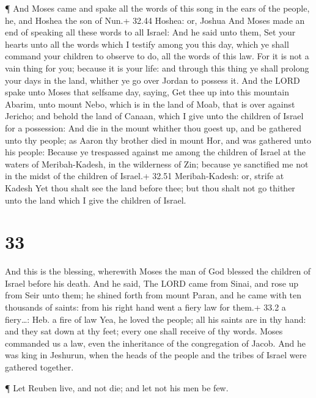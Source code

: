  ¶ And Moses came and spake all the words of this song in
the ears of the people, he, and Hoshea the son of Nun.+ 32.44 Hoshea:
or, Joshua  And Moses made an end of speaking all these
words to all Israel:  And he said unto them, Set your
hearts unto all the words which I testify among you this day, which ye
shall command your children to observe to do, all the words of this law.
 For it is not a vain thing for you; because it is your
life: and through this thing ye shall prolong your days in the land,
whither ye go over Jordan to possess it.  And the LORD
spake unto Moses that selfsame day, saying,  Get thee up
into this mountain Abarim, unto mount Nebo, which is in the land of
Moab, that is over against Jericho; and behold the land of Canaan, which
I give unto the children of Israel for a possession:  And
die in the mount whither thou goest up, and be gathered unto thy people;
as Aaron thy brother died in mount Hor, and was gathered unto his
people:  Because ye trespassed against me among the
children of Israel at the waters of Meribah-Kadesh, in the wilderness of
Zin; because ye sanctified me not in the midst of the children of
Israel.+ 32.51 Meribah-Kadesh: or, strife at Kadesh  Yet
thou shalt see the land before thee; but thou shalt not go thither unto
the land which I give the children of Israel.

\hypertarget{section-32}{%
\section{33}\label{section-32}}

 And this is the blessing, wherewith Moses the man of God
blessed the children of Israel before his death.  And he
said, The LORD came from Sinai, and rose up from Seir unto them; he
shined forth from mount Paran, and he came with ten thousands of saints:
from his right hand went a fiery law for them.+ 33.2 a fiery\ldots: Heb.
a fire of law  Yea, he loved the people; all his saints are
in thy hand: and they sat down at thy feet; every one shall receive of
thy words.  Moses commanded us a law, even the inheritance
of the congregation of Jacob.  And he was king in Jeshurun,
when the heads of the people and the tribes of Israel were gathered
together.

 ¶ Let Reuben live, and not die; and let not his men be few.

